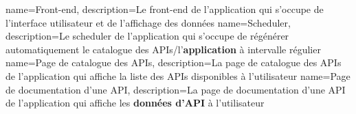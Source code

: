 {
    name=Front-end,
    description={Le front-end de l'application qui s'occupe de l'interface utilisateur et de l'affichage des données}
}
{
    name=Scheduler,
    description={Le scheduler de l'application qui s'occupe de régénérer automatiquement le catalogue des APIs/l'\textbf{application} à intervalle régulier}
}
{
    name=Page de catalogue des APIs,
    description={La page de catalogue des APIs de l'application qui affiche la liste des APIs disponibles à l'utilisateur}
}
{
    name=Page de documentation d'une API,
    description={La page de documentation d'une API de l'application qui affiche les \textbf{données d'API} à l'utilisateur}
}
